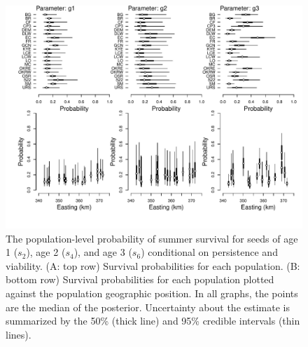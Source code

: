 \documentclass[12pt, oneside]{article}   	%
\begin{document}
 \begin{figure}[!h]
        \centering
        \includegraphics[page=3,width=\textwidth]{../../figures/structured-parameters-all.pdf} 
            \caption{ The population-level probability of summer survival for seeds of age 1 ($s_2$), age 2 ($s_4$), and age 3 ($s_6$) conditional on persistence and viability. (A: top row) Survival probabilities for each population. (B: bottom row) Survival probabilities for each population plotted against the population geographic position. In all graphs, the points are the median of the posterior. Uncertainty about the estimate is summarized by the 50\% (thick line) and 95\% credible intervals (thin lines). }
 \label{fig:germination-estimates-population}
\end{figure}
\end{document}
